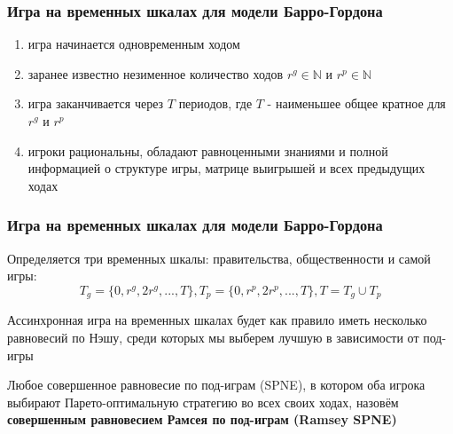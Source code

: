 \documentclass {beamer}
\begin{document}

%  


\begin{frame}
\frametitle{Игра на временных шкалах для модели Барро-Гордона}
\begin{enumerate}
\item
 игра начинается одновременным ходом
 \item
 заранее известно незименное количество ходов $r^g \in \mathbb{N}$ и $r^p \in \mathbb{N}$
 \item игра заканчивается через $T$ периодов, где $T$ - наименьшее общее кратное для $r^g$ и $r^p$
 \item
 игроки рациональны, обладают равноценными знаниями и полной информацией о структуре игры, матрице выигрышей и всех предыдущих ходах
\end{enumerate}
\end{frame}

\begin{frame}
	\frametitle{Игра на временных шкалах для модели Барро-Гордона}
	Определяется три временных шкалы: правительства, общественности и самой игры:
	\begin{equation}
	\label{eq:sec:tech:scales}
	T_g = \{0,r^g,2r^g,...,T\}, T_p=\{0,r^p,2r^p,...,T\}, T=T_g\cup T_p 
	\end{equation}
	
	Ассинхронная игра на временных шкалах будет как правило иметь несколько равновесий по Нэшу, среди которых мы выберем лучшую в зависимости от под-игры
	\begin{definition}
		Любое совершенное равновесие по под-играм (SPNE), в котором оба игрока выбирают Парето-оптимальную стратегию  во всех своих ходах, назовём \textbf{совершенным равновесием Рамсея по под-играм (Ramsey SPNE)}
	\end{definition}
\end{frame}
\end{document}
